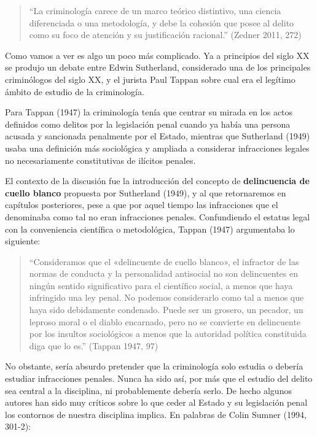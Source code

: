 \documentclass[
  spanish,
  letterpaper,
  DIV=11,
  numbers=noendperiod]{scrreprt}
\begin{document}
\begin{quote}
``La criminología carece de un marco teórico distintivo, una ciencia
diferenciada o una metodología, y debe la cohesión que posee al delito
como su foco de atención y su justificación racional.'' (Zedner 2011,
272)
\end{quote}

Como vamos a ver es algo un poco más complicado. Ya a principios del
siglo XX se produjo un debate entre Edwin Sutherland, considerado una de
los principales criminólogos del siglo XX, y el jurista Paul Tappan
sobre cual era el legítimo ámbito de estudio de la criminología.

Para Tappan (1947) la criminología tenía que centrar su mirada en los
actos definidos como delitos por la legislación penal cuando ya había
una persona acusada y sancionada penalmente por el Estado, mientras que
Sutherland (1949) usaba una definición más sociológica y ampliada a
considerar infracciones legales no necesariamente constitutivas de
ilícitos penales.

El contexto de la discusión fue la introducción del concepto de
\textbf{delincuencia de cuello blanco} propuesta por Sutherland (1949),
y al que retornaremos en capítulos posteriores, pese a que por aquel
tiempo las infracciones que el denominaba como tal no eran infracciones
penales. Confundiendo el estatus legal con la conveniencia científica o
metodológica, Tappan (1947) argumentaba lo siguiente:

\begin{quote}
``Consideramos que el «delincuente de cuello blanco», el infractor de
las normas de conducta y la personalidad antisocial no son delincuentes
en ningún sentido significativo para el científico social, a menos que
haya infringido una ley penal. No podemos considerarlo como tal a menos
que haya sido debidamente condenado. Puede ser un grosero, un pecador,
un leproso moral o el diablo encarnado, pero no se convierte en
delincuente por los insultos sociológicos a menos que la autoridad
política constituida diga que lo es.'' (Tappan 1947, 97)
\end{quote}

No obstante, sería absurdo pretender que la criminología solo estudia o
debería estudiar infracciones penales. Nunca ha sido así, por más que el
estudio del delito sea central a la disciplina, ni probablemente debería
serlo. De hecho algunos autores han sido muy críticos sobre lo que ceder
al Estado y su legislación penal los contornos de nuestra disciplina
implica. En palabras de Colin Sumner (1994, 301-2):
\end{document}
